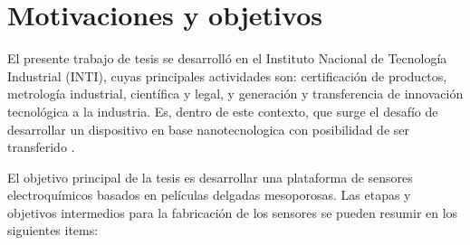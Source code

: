 



\section{Motivaciones y objetivos}

	El presente trabajo de tesis se desarrolló en el Instituto Nacional de Tecnología Industrial (INTI), cuyas principales actividades son: certificación de productos, metrología industrial, científica y legal, y generación y transferencia	de innovación tecnológica a la industria. Es, dentro de este contexto, que surge el desafío de desarrollar un dispositivo en base nanotecnologica con posibilidad de ser transferido . 

	El objetivo principal de la tesis es desarrollar una plataforma de sensores electroquímicos basados en películas delgadas mesoporosas. Las etapas y objetivos intermedios para la fabricación de los sensores se pueden resumir en los siguientes items:

